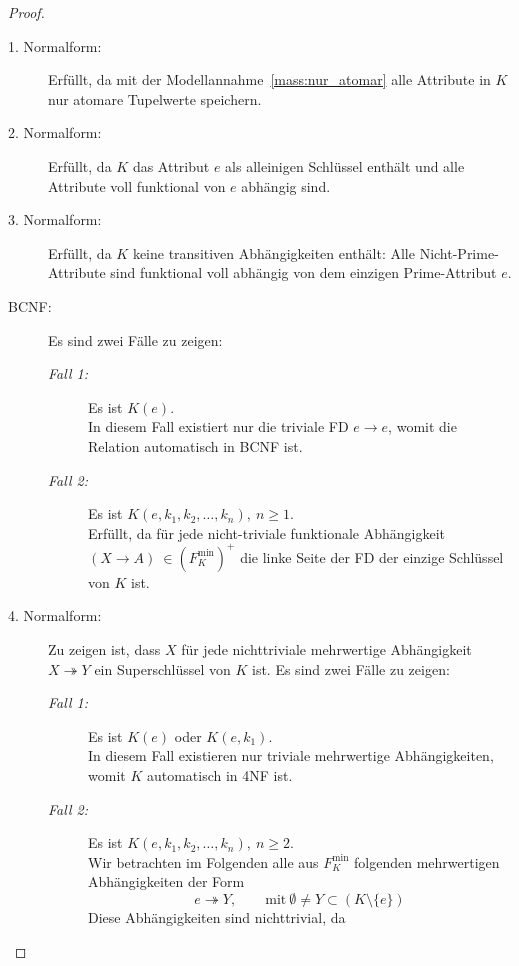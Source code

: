 \begin{proof}
    \medskip
    {\ }
    \begin{description}
        \item[1. Normalform:] Erfüllt, da mit der Modellannahme~\ref{mass:nur_atomar} alle Attribute in $K$ nur atomare Tupelwerte speichern.
        \item[2. Normalform:] Erfüllt, da $K$ das Attribut $e$ als alleinigen Schlüssel enthält und alle Attribute voll funktional von $e$ abhängig sind.
        \item[3. Normalform:] Erfüllt, da $K$ keine transitiven Abhängigkeiten enthält: Alle Nicht-Prime-Attribute sind funktional voll abhängig von dem einzigen Prime-Attribut $e$.
        \item[BCNF:] Es sind zwei Fälle zu zeigen:
        \begin{description}
            \item[\textit{Fall 1:}] Es ist $K(e)$.\\
            In diesem Fall existiert nur die triviale FD $e \rightarrow e$, womit die Relation automatisch in BCNF ist.
            \item[\textit{Fall 2:}] Es ist $K(e, k_1, k_2, \ldots, k_n),\ n \geq 1$.\\
            Erfüllt, da für jede nicht-triviale funktionale Abhängigkeit $(X \rightarrow A)\ \in (F^\text{min}_{K})^+$ die linke Seite der FD der einzige Schlüssel von $K$ ist.
        \end{description}
        \item[4. Normalform:] Zu zeigen ist, dass $X$ für jede nichttriviale mehrwertige Abhängigkeit $X \twoheadrightarrow Y$ ein Superschlüssel von $K$ ist.
        Es sind zwei Fälle zu zeigen:
        \begin{description}
            \item[\textit{Fall 1:}] Es ist $K(e)$ oder $K(e, k_1)$.\\
            In diesem Fall existieren nur triviale mehrwertige Abhängigkeiten, womit $K$ automatisch in 4NF ist.
            \item[\textit{Fall 2:}] Es ist $K(e, k_1, k_2, \ldots, k_n),\ n \geq 2$.\\
        Wir betrachten im Folgenden alle aus $F^\text{min}_{K}$ folgenden mehrwertigen Abhängigkeiten der Form
        \[
            e \twoheadrightarrow Y,\qquad \text{mit}\ \emptyset \neq Y \subset (K \setminus \{e\})
        \]
        \noindent
        Diese Abhängigkeiten sind nichttrivial, da
        \[
\]
\end{description}
\end{description}
\end{proof}
